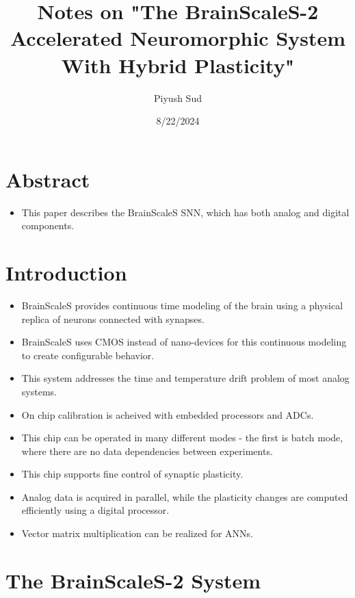 \documentclass[12pt, letterpaper]{article}
\title{Notes on "The BrainScaleS-2 Accelerated Neuromorphic System With Hybrid Plasticity"}
\author{Piyush Sud}
\date{8/22/2024}
\begin{document}
\maketitle

\pagebreak

\section{Abstract}
\begin{itemize}
    \item This paper describes the BrainScaleS SNN, which has both analog and digital components.
\end{itemize}


\section{Introduction}
\begin{itemize}
    \item BrainScaleS provides continuous time modeling of the brain using a physical replica of neurons connected with synapses.
    \item BrainScaleS uses CMOS instead of nano-devices for this continuous modeling to create configurable behavior.
    \item This system addresses the time and temperature drift problem of most analog systems.
    \item On chip calibration is acheived with embedded processors and ADCs.
    \item This chip can be operated in many different modes - the first is batch mode, where there are no data dependencies between experiments.
    \item This chip supports fine control of synaptic plasticity.
    \item Analog data is acquired in parallel, while the plasticity changes are computed efficiently using a digital processor.
    \item Vector matrix multiplication can be realized for ANNs. 
\end{itemize}

\section{The BrainScaleS-2 System}
\end{document}
